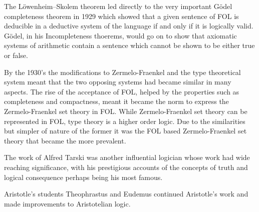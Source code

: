 The L\"{o}wenheim–Skolem theorem led directly to the very important G\"{o}del completeness theorem in 1929 which showed that a given sentence of FOL is deducible in a deductive system of the language if and only if it is logically valid.  G\"{o}del, in his Incompleteness thoerems,  would go on to show that axiomatic systems of arithmetic contain a sentence which cannot be shown to be either true or false. \cite{ KingShapiro95} 

By the 1930's the modifications to Zermelo-Fraenkel and the type theoretical system meant that the two opposing systems had became similar in many aspects. The rise of the acceptance of FOL, helped by the properties such as completeness and compactness, meant it became the norm to express the Zermelo-Fraenkel set theory in FOL. While Zermelo-Fraenkel set theory can be represented in FOL, type theory is a higher order logic. Due to the similarities but simpler of nature of the former it was the FOL based Zermelo-Fraenkel set theory that became the more prevalent.\cite[p.~478]{Ferreiros01}

The work of Alfred Tarski was another influential logician whose work had wide reaching  significance, with his prestigious accounts of the concepts of truth and logical consequence perhaps being his most famous.




Aristotle's students Theophrastus and Eudemus continued Aristotle's work and made improvements to Aristotelian logic. 